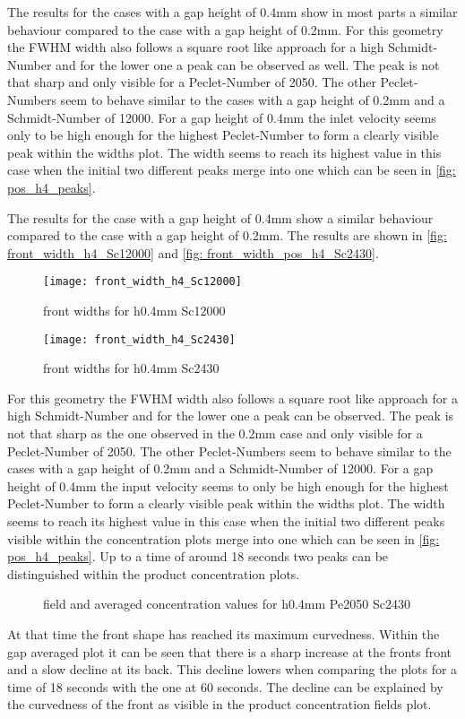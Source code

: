 \documentclass[../thesis.tex]{subfiles}
\begin{document}
The results for the cases with a gap height of 0.4mm show in most parts a similar behaviour compared to the case with a gap height of 0.2mm. For this geometry the FWHM width also follows a square root like approach for a high Schmidt-Number and for the lower one a peak can be observed as well. The peak is not that sharp and only visible for a Peclet-Number of 2050. The other Peclet-Numbers seem to behave similar to the cases with a gap height of 0.2mm and a Schmidt-Number of 12000. For a gap height of 0.4mm the inlet velocity seems only to be high enough for the highest Peclet-Number to form a clearly visible peak within the widths plot. The width seems to reach its highest value in this case when the initial two different peaks merge into one which can be seen in \autoref{fig: pos_h4_peaks}.

The results for the case with a gap height of 0.4mm show a similar behaviour compared to the case with a gap height of 0.2mm. The results are shown in \autoref{fig: front_width_h4_Sc12000} and \autoref{fig: front_width_pos_h4_Sc2430}.
\begin{figure}[htbp]
	\centering
	\texttt{[image: front\_width\_h4\_Sc12000]}
	\caption{front widths for h0.4mm Sc12000\label{fig: front_width_h4_Sc12000}}\bigskip
	\texttt{[image: front\_width\_h4\_Sc2430]}
	\caption{front widths for h0.4mm Sc2430\label{fig: front_width_pos_h4_Sc2430}}
\end{figure}
 For this geometry the FWHM width also follows a square root like approach for a high Schmidt-Number and for the lower one a peak can be observed. The peak is not that sharp as the one observed in the 0.2mm case and only visible for a Peclet-Number of 2050. The other Peclet-Numbers seem to behave similar to the cases with a gap height of 0.2mm and a Schmidt-Number of 12000. For a gap height of 0.4mm the input velocity seems to only be high enough for the highest Peclet-Number to form a clearly visible peak within the widths plot. The width seems to reach its highest value in this case when the initial two different peaks visible within the concentration plots merge into one which can be seen in \autoref{fig: pos_h4_peaks}. Up to a time of around 18 seconds two peaks can be distinguished within the product concentration plots. 
\begin{figure}[htb]
	\centering
	\qquad
	\caption{field and averaged concentration values for h0.4mm Pe2050 Sc2430}%
	\label{fig: pos_h4_peaks}%
\end{figure}
At that time the front shape has reached its maximum curvedness. Within the gap averaged plot it can be seen that there is a sharp increase at the fronts front and a slow decline at its back. This decline lowers when comparing the plots for a time of 18 seconds with the one at 60 seconds. The decline can be explained by the curvedness of the front as visible in the product concentration fields plot.
\newline
\end{document}
